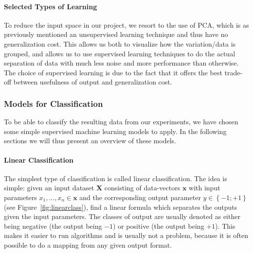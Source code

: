 \paragraph{Selected Types of Learning}
\label{par:SelectedTypesofLearning}
To reduce the input space in our project, we resort to the use of PCA, which is as previously mentioned an unsupervised learning technique
and thus have no generalization cost. This allows us both to visualize how the variation/data is grouped, and allows us to
use supervised learning techniques to do the actual separation of data with much less noise and more performance than otherwise.
The choice of supervised learning is due to the fact that it offers the best trade-off between usefulness of output and generalization cost.

\subsubsection{Models for Classification}
\label{ssub:ModelsforClassification}
To be able to classify the resulting data from our experiments, we have chosen some simple supervised machine learning models to apply.
In the following sections we will thus present an overview of these models.
\paragraph{Linear Classification}
\label{par:LinearClassification}
The simplest type of classification is called linear classification.
The idea is simple: given an input dataset $\mathbf{X}$ consisting of data-vectors $\mathbf{x}$ with input parameters $x_1, \dots, x_n \in \mathbf{x}$ and the corresponding output parameter $y \in \left\{-1;+1\right\}$ (see Figure~\ref{fig:linearclass}), 
find a linear formula which separates the outputs given the input parameters.
The classes of output are usually denoted as either being negative (the output being $-1$) or positive (the output being $+1$). 
This makes it easier to run algorithms and is usually not a problem, because it is often possible to do a mapping from any given output format.\\

\begin{minipage}{\linewidth}
\centering
{}
\label{fig:linearclass}
\end{minipage}\\\\

